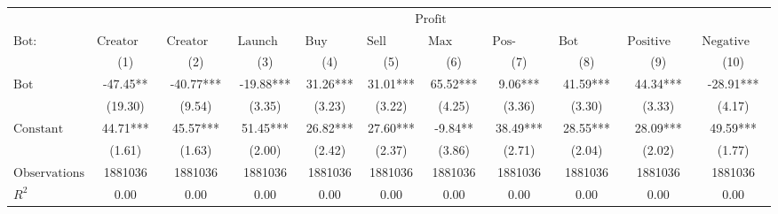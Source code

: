\begin{tabular}{lcccccccccc}
\hline
 & \multicolumn{10}{c}{$\text{Profit}$} \\
 $\text{Bot}:$ & $\text{Creator Launch Bundle}$ & $\text{Creator Buy Bundle}$ & $\text{Launch Bundle}$ & $\text{Buy Bundle}$ & $\text{Sell Bundle}$ & $\text{Max Same Txn}$ & $\text{Pos-\#Swaps Ratio}$ & $\text{Bot Comment}$ & $\text{Positive Comment Bot}$ & $\text{Negative Comment Bot}$ \\
 & (1) & (2) & (3) & (4) & (5) & (6) & (7) & (8) & (9) & (10)\\
\hline
$\text{Bot}$ & -47.45** & -40.77*** & -19.88*** & 31.26*** & 31.01*** & 65.52*** & 9.06*** & 41.59*** & 44.34*** & -28.91*** \\
 & (19.30) & (9.54) & (3.35) & (3.23) & (3.22) & (4.25) & (3.36) & (3.30) & (3.33) & (4.17) \\
$\text{Constant}$ & 44.71*** & 45.57*** & 51.45*** & 26.82*** & 27.60*** & -9.84** & 38.49*** & 28.55*** & 28.09*** & 49.59*** \\
 & (1.61) & (1.63) & (2.00) & (2.42) & (2.37) & (3.86) & (2.71) & (2.04) & (2.02) & (1.77) \\
$\text{Observations}$ & 1881036 & 1881036 & 1881036 & 1881036 & 1881036 & 1881036 & 1881036 & 1881036 & 1881036 & 1881036 \\
$R^2$ & 0.00 & 0.00 & 0.00 & 0.00 & 0.00 & 0.00 & 0.00 & 0.00 & 0.00 & 0.00 \\
\hline
\end{tabular}